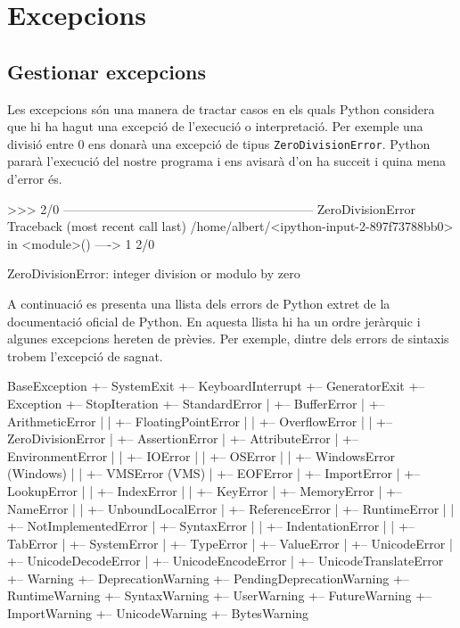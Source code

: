 \chapter{Excepcions}


\section{Gestionar excepcions}

Les excepcions són una manera de tractar casos en els quals Python considera que hi ha hagut una excepció de l'execució o interpretació. Per exemple una divisió entre 0 ens donarà una excepció de tipus {\tt ZeroDivisionError}. Python pararà l'execució del nostre programa i ens avisarà d'on ha succeit i quina mena d'error és.


\begin{blockcode}
>>> 2/0
------------------------------------------------------------
ZeroDivisionError          Traceback (most recent call last)
/home/albert/<ipython-input-2-897f73788bb0> in <module>()
----> 1 2/0

ZeroDivisionError: integer division or modulo by zero
\end{blockcode}

A continuació es presenta una llista dels errors de Python extret de la documentació oficial de Python. En aquesta llista hi ha un ordre jeràrquic i algunes excepcions hereten de prèvies. Per exemple, dintre dels errors de sintaxis trobem l'excepció de sagnat.


\begin{blockcode}
BaseException
 +-- SystemExit
 +-- KeyboardInterrupt
 +-- GeneratorExit
 +-- Exception
      +-- StopIteration
      +-- StandardError
      |    +-- BufferError
      |    +-- ArithmeticError
      |    |    +-- FloatingPointError
      |    |    +-- OverflowError
      |    |    +-- ZeroDivisionError
      |    +-- AssertionError
      |    +-- AttributeError
      |    +-- EnvironmentError
      |    |    +-- IOError
      |    |    +-- OSError
      |    |         +-- WindowsError (Windows)
      |    |         +-- VMSError (VMS)
      |    +-- EOFError
      |    +-- ImportError
      |    +-- LookupError
      |    |    +-- IndexError
      |    |    +-- KeyError
      |    +-- MemoryError
      |    +-- NameError
      |    |    +-- UnboundLocalError
      |    +-- ReferenceError
      |    +-- RuntimeError
      |    |    +-- NotImplementedError
      |    +-- SyntaxError
      |    |    +-- IndentationError
      |    |         +-- TabError
      |    +-- SystemError
      |    +-- TypeError
      |    +-- ValueError
      |         +-- UnicodeError
      |              +-- UnicodeDecodeError
      |              +-- UnicodeEncodeError
      |              +-- UnicodeTranslateError
      +-- Warning
           +-- DeprecationWarning
           +-- PendingDeprecationWarning
           +-- RuntimeWarning
           +-- SyntaxWarning
           +-- UserWarning
           +-- FutureWarning
	   +-- ImportWarning
	   +-- UnicodeWarning
	   +-- BytesWarning
\end{blockcode}  
	   


